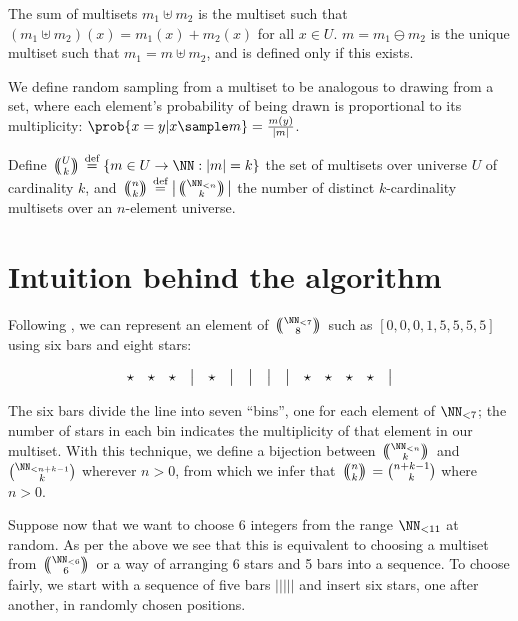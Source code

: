 \documentclass[letterpaper,luatex,11pt]{article}
\newcommand{\multichoose}[2]{
\left.\mathchoice
  {\left(\kern-0.48em\binom{#1}{#2}\kern-0.48em\right)}
  {\big(\kern-0.30em\binom{\smash{#1}}{\smash{#2}}\kern-0.30em\big)}
  {\left(\kern-0.30em\binom{\smash{#1}}{\smash{#2}}\kern-0.30em\right)}
  {\left(\kern-0.30em\binom{\smash{#1}}{\smash{#2}}\kern-0.30em\right)}
\right.}
\newcommand*{\defeq}{\stackrel{\text{def}}{=}}
\begin{document}
The sum of multisets $m_1 \uplus m_2$ is the multiset such that
$(m_1 \uplus m_2)(x) = m_1(x) + m_2(x)$ for all $x \in U$.
$m = m_1 \ominus m_2$ is the unique multiset such that $m_1 = m \uplus m_2$,
and is defined only if this exists.

We define random sampling from a multiset to be analogous to drawing from a set,
where each element's probability of being drawn is proportional to its multiplicity:
$\prob{x = y |x \sample m} = \frac{m(y)}{|m|}$.

Define $\multichoose{U}{k} \defeq \{m \in U \rightarrow \NN: |m| = k\}$ the set of multisets over
universe \(U\) of cardinality \(k\), and \(\multichoose{n}{k} \defeq \left|\multichoose{\NN_{<n}}{k}\right|\)
the number of distinct \(k\)-cardinality multisets over an \(n\)-element universe.

\section{Intuition behind the algorithm}

Following \cite{feller}, we can represent an element of \(\multichoose{\NN_{<7}}{8}\)
such as \([0,0,0,1,5,5,5,5]\) using six bars and eight stars:

\begin{displaymath}
    \begin{array}{ c c c c c c c c c c c c c c c }
        \star & \star & \star & \big| & \star & \big| & \big| & \big| & \big| & \star & \star & \star & \star & \big| \\
    \end{array}
\end{displaymath}

The six bars divide the line into seven ``bins'', one for each element of \(\NN_{<7}\); the
number of stars in each bin indicates the multiplicity of that element in our multiset.
With this technique, we define a bijection between \(\multichoose{\NN_{<n}}{k}\) and
\(\binom{\NN_{<n + k - 1}}{k}\) wherever \(n > 0\), from which we infer that
\(\multichoose{n}{k} = \binom{n + k - 1}{k}\) where \(n > 0\).

Suppose now that we want to choose 6 integers from the range $\NN_{<11}$ 
at random. As per the above we see that this 
is equivalent to choosing a multiset from \(\multichoose{\NN_{<6}}{6}\)
or a way of arranging 6 stars and 5 bars into a sequence.
To choose fairly, we start with a sequence of five bars \(|||||\) and insert six stars,
one after another, in randomly chosen positions.
\end{document}
